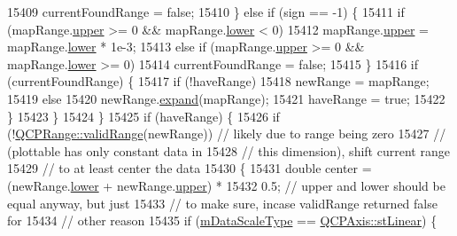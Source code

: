 \begin{DoxyCode}
15409           currentFoundRange = \textcolor{keyword}{false};
15410       \} \textcolor{keywordflow}{else} \textcolor{keywordflow}{if} (sign == -1) \{
15411         \textcolor{keywordflow}{if} (mapRange.\hyperlink{class_q_c_p_range_ae44eb3aafe1d0e2ed34b499b6d2e074f}{upper} >= 0 && mapRange.\hyperlink{class_q_c_p_range_aa3aca3edb14f7ca0c85d912647b91745}{lower} < 0)
15412           mapRange.\hyperlink{class_q_c_p_range_ae44eb3aafe1d0e2ed34b499b6d2e074f}{upper} = mapRange.\hyperlink{class_q_c_p_range_aa3aca3edb14f7ca0c85d912647b91745}{lower} * 1e-3;
15413         \textcolor{keywordflow}{else} \textcolor{keywordflow}{if} (mapRange.\hyperlink{class_q_c_p_range_ae44eb3aafe1d0e2ed34b499b6d2e074f}{upper} >= 0 && mapRange.\hyperlink{class_q_c_p_range_aa3aca3edb14f7ca0c85d912647b91745}{lower} >= 0)
15414           currentFoundRange = \textcolor{keyword}{false};
15415       \}
15416       \textcolor{keywordflow}{if} (currentFoundRange) \{
15417         \textcolor{keywordflow}{if} (!haveRange)
15418           newRange = mapRange;
15419         \textcolor{keywordflow}{else}
15420           newRange.\hyperlink{class_q_c_p_range_a0fa1bc8048be50d52bea93a8caf08305}{expand}(mapRange);
15421         haveRange = \textcolor{keyword}{true};
15422       \}
15423     \}
15424   \}
15425   \textcolor{keywordflow}{if} (haveRange) \{
15426     \textcolor{keywordflow}{if} (!\hyperlink{class_q_c_p_range_ab38bd4841c77c7bb86c9eea0f142dcc0}{QCPRange::validRange}(newRange)) \textcolor{comment}{// likely due to range being zero}
15427                                          \textcolor{comment}{// (plottable has only constant data in}
15428                                          \textcolor{comment}{// this dimension), shift current range}
15429                                          \textcolor{comment}{// to at least center the data}
15430     \{
15431       \textcolor{keywordtype}{double} center = (newRange.\hyperlink{class_q_c_p_range_aa3aca3edb14f7ca0c85d912647b91745}{lower} + newRange.\hyperlink{class_q_c_p_range_ae44eb3aafe1d0e2ed34b499b6d2e074f}{upper}) *
15432                       0.5; \textcolor{comment}{// upper and lower should be equal anyway, but just}
15433                            \textcolor{comment}{// to make sure, incase validRange returned false for}
15434                            \textcolor{comment}{// other reason}
15435       \textcolor{keywordflow}{if} (\hyperlink{class_q_c_p_color_scale_a2754d6a78736f64a241e333fbd955372}{mDataScaleType} == \hyperlink{class_q_c_p_axis_a36d8e8658dbaa179bf2aeb973db2d6f0aff6e30a11a828bc850caffab0ff994f6}{QCPAxis::stLinear}) \{

\end{DoxyCode}
